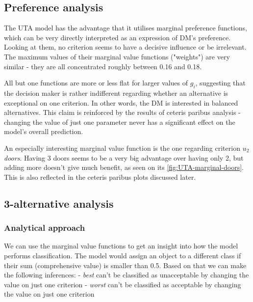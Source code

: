 \documentclass[../main.tex]{subfiles}
\begin{document}
\subsection{Preference analysis}

The UTA model has the advantage that it utilises marginal preference functions,
which can be very directly interpreted as an expression of DM's preference.
Looking at them, no criterion seems to have a decisive influence or be irrelevant.
The maximum values of their marginal value functions ("weights")
are very similar - they are all concentrated roughly between 0.16 and 0.18.

All but one functions are more or less flat for larger values of $g_i$, suggesting
that the decision maker is rather indifferent regarding whether an alternative is
exceptional on one criterion. In other words, the DM is interested in balanced alternatives.
This claim is reinforced by the results of ceteris paribus analysis -
changing the value of just one parameter never has a significant effect on
the model's overall prediction.

An especially interesting marginal value function is the one regarding criterion $u_2$ \emph{doors}.
Having 3 doors seems to be a very big advantage over having only 2,
but adding more doesn't give much benefit, as seen on  its \ref{fig:UTA-marginal-doors}.
This is also reflected in the ceteris paribus plots discussed later.


\subsection{3-alternative analysis}

\subsubsection{Analytical approach}
We can use the marginal value functions to get an insight into how the model
performs classification. The model would assign an object to a different class if
their sum (comprehensive value) is smaller than 0.5. Based on that we can make the
following inferences:
- \emph{best} can't be classified as unacceptable by changing the value on just one criterion
- \emph{worst} can't be classified as acceptable by changing the value on just one criterion
\end{document}

